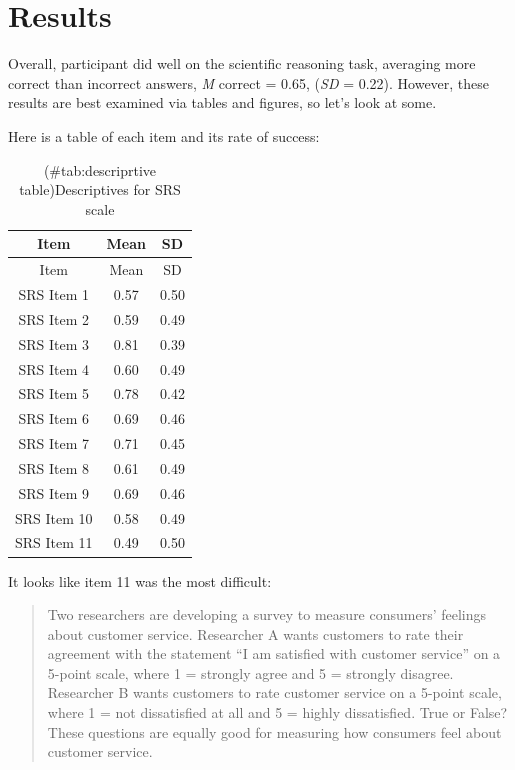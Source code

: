 \documentclass[
  english,
  man,floatsintext]{apa6}
\begin{document}
\section{Results}\label{results}

Overall, participant did well on the scientific reasoning task, averaging more correct than incorrect answers, \emph{M} correct = 0.65, (\emph{SD} = 0.22). However, these results are best examined via tables and figures, so let's look at some.

Here is a table of each item and its rate of success:

\begin{longtable}[]{@{}ccc@{}}
\caption{(\#tab:descriprtive table)Descriptives for SRS scale}\tabularnewline
\toprule\noalign{}
Item & Mean & SD \\
\midrule\noalign{}
\endfirsthead
\toprule\noalign{}
Item & Mean & SD \\
\midrule\noalign{}
\endhead
\bottomrule\noalign{}
\endlastfoot
SRS Item 1 & 0.57 & 0.50 \\
SRS Item 2 & 0.59 & 0.49 \\
SRS Item 3 & 0.81 & 0.39 \\
SRS Item 4 & 0.60 & 0.49 \\
SRS Item 5 & 0.78 & 0.42 \\
SRS Item 6 & 0.69 & 0.46 \\
SRS Item 7 & 0.71 & 0.45 \\
SRS Item 8 & 0.61 & 0.49 \\
SRS Item 9 & 0.69 & 0.46 \\
SRS Item 10 & 0.58 & 0.49 \\
SRS Item 11 & 0.49 & 0.50 \\
\end{longtable}

It looks like item 11 was the most difficult:

\begin{quote}
Two researchers are developing a survey to measure consumers' feelings about customer service. Researcher A wants customers to rate their agreement with the statement ``I am satisfied with customer service'' on a 5-point scale, where 1 = strongly agree and 5 = strongly disagree. Researcher B wants customers to rate customer service on a 5-point scale, where 1 = not dissatisfied at all and 5 = highly dissatisfied.
True or False? These questions are equally good for measuring how consumers feel about customer service.
\end{quote}
\end{document}
